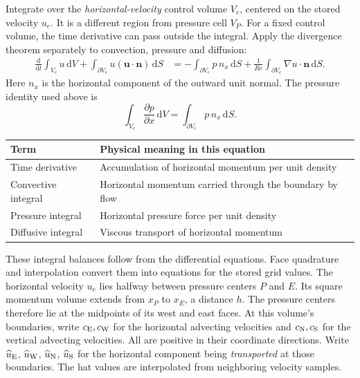 Integrate over the \emph{horizontal-velocity} control volume $V_e$, centered
on the stored velocity $u_e$. It is a different region from pressure cell $V_P$.
For a fixed control volume, the time derivative can pass outside the integral.
Apply the divergence theorem separately to convection, pressure and diffusion:
\begin{align*}
\frac{\mathrm d}{\mathrm dt}\int_{V_e}u\,\mathrm dV
+\int_{\partial V_e}u(\boldsymbol u\cdot\boldsymbol n)\,\mathrm dS
&=-\int_{\partial V_e}p\,n_x\,\mathrm dS
+\frac{1}{Re}\int_{\partial V_e}\nabla u\cdot\boldsymbol n\,\mathrm dS.
\end{align*}
Here $n_x$ is the horizontal component of the outward unit normal.
The pressure identity used above is
\[
\int_{V_e}\frac{\partial p}{\partial x}\,\mathrm dV
=\int_{\partial V_e}p\,n_x\,\mathrm dS.
\]
\begin{center}\begin{tabular}{lp{.67\linewidth}}\toprule
Term & Physical meaning in this equation\\\midrule
Time derivative & Accumulation of horizontal momentum per unit density\\
Convective integral & Horizontal momentum carried through the boundary by flow\\
Pressure integral & Horizontal pressure force per unit density\\
Diffusive integral & Viscous transport of horizontal momentum\\\bottomrule
\end{tabular}\end{center}
These integral balances follow from the differential equations. Face quadrature
and interpolation convert them into equations for the stored grid values.
\newpage
{}
The horizontal velocity $u_e$ lies halfway between pressure centers $P$ and $E$.
Its square momentum volume extends from $x_P$ to $x_E$, a distance $h$.
The pressure centers therefore lie at the midpoints of its west and east faces.
At this volume's boundaries, write $c_{\rm E},c_{\rm W}$ for the horizontal
advecting velocities and $c_{\rm N},c_{\rm S}$ for the vertical advecting velocities.
All are positive in their coordinate directions. Write $\widehat u_{\rm E}$,
$\widehat u_{\rm W}$, $\widehat u_{\rm N}$, $\widehat u_{\rm S}$ for the
horizontal component being \emph{transported} at those boundaries.
The hat values are interpolated from neighboring velocity samples.

